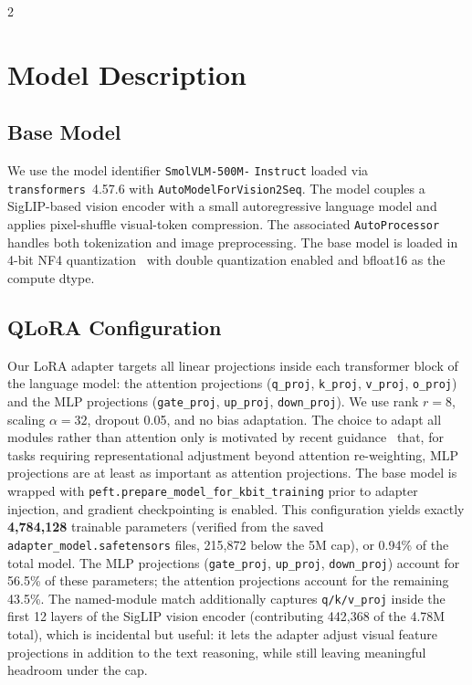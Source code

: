 \documentclass[11pt,a4paper]{article}
\begin{document}
\begin{multicols}{2}
\section{Model Description}

\subsection{Base Model}

We use the model identifier \texttt{SmolVLM-500M-} \texttt{Instruct} loaded via \texttt{transformers}~4.57.6 with \texttt{AutoModelForVision2Seq}. The model couples a SigLIP-based vision encoder with a small autoregressive language model and applies pixel-shuffle visual-token compression. The associated \texttt{AutoProcessor} handles both tokenization and image preprocessing. The base model is loaded in 4-bit NF4 quantization~\cite{dettmers2023qlora} with double quantization enabled and bfloat16 as the compute dtype.

\subsection{QLoRA Configuration}

Our LoRA adapter targets all linear projections inside each transformer block of the language model: the attention projections (\texttt{q\_proj}, \texttt{k\_proj}, \texttt{v\_proj}, \texttt{o\_proj}) and the MLP projections (\texttt{gate\_proj}, \texttt{up\_proj}, \texttt{down\_proj}). We use rank $r=8$, scaling $\alpha=32$, dropout 0.05, and no bias adaptation. The choice to adapt all modules rather than attention only is motivated by recent guidance~\cite{schulman2025loraregret} that, for tasks requiring representational adjustment beyond attention re-weighting, MLP projections are at least as important as attention projections. The base model is wrapped with \texttt{peft.prepare\_model\_for\_kbit\_training} prior to adapter injection, and gradient checkpointing is enabled. This configuration yields exactly \textbf{4{,}784{,}128} trainable parameters (verified from the saved \texttt{adapter\_model.safetensors} files, 215{,}872 below the 5M cap), or 0.94\% of the total model. The MLP projections (\texttt{gate\_proj}, \texttt{up\_proj}, \texttt{down\_proj}) account for 56.5\% of these parameters; the attention projections account for the remaining 43.5\%. The named-module match additionally captures \texttt{q/k/v\_proj} inside the first 12 layers of the SigLIP vision encoder (contributing 442{,}368 of the 4.78M total), which is incidental but useful: it lets the adapter adjust visual feature projections in addition to the text reasoning, while still leaving meaningful headroom under the cap.


\end{multicols}
\end{document}
